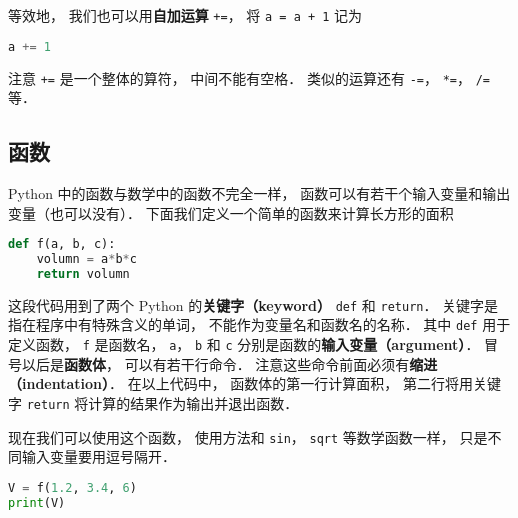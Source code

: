 等效地， 我们也可以用\textbf{自加运算} \verb|+=|， 将 \verb|a = a + 1| 记为
\begin{lstlisting}[language=python]
a += 1
\end{lstlisting}
注意 \verb|+=| 是一个整体的算符， 中间不能有空格． 类似的运算还有 \verb|-=|， \verb|*=|， \verb|/=| 等．

\subsection{函数}
Python 中的函数与数学中的函数不完全一样， 函数可以有若干个输入变量和输出变量（也可以没有）． 下面我们定义一个简单的函数来计算长方形的面积
\begin{lstlisting}[language=python]
def f(a, b, c):
    volumn = a*b*c
    return volumn
\end{lstlisting}
这段代码用到了两个 Python 的\textbf{关键字（keyword）} \verb|def| 和 \verb|return|． 关键字是指在程序中有特殊含义的单词， 不能作为变量名和函数名的名称． 其中 \verb|def| 用于定义函数， \verb|f| 是函数名， \verb|a|， \verb|b| 和 \verb|c| 分别是函数的\textbf{输入变量（argument）}． 冒号以后是\textbf{函数体}， 可以有若干行命令． 注意这些命令前面必须有\textbf{缩进（indentation）}．  在以上代码中， 函数体的第一行计算面积， 第二行将用关键字 \verb|return| 将计算的结果作为输出并退出函数．

现在我们可以使用这个函数， 使用方法和 \verb|sin|， \verb|sqrt| 等数学函数一样， 只是不同输入变量要用逗号隔开．
\begin{lstlisting}[language=python]
V = f(1.2, 3.4, 6)
print(V)
\end{lstlisting}
